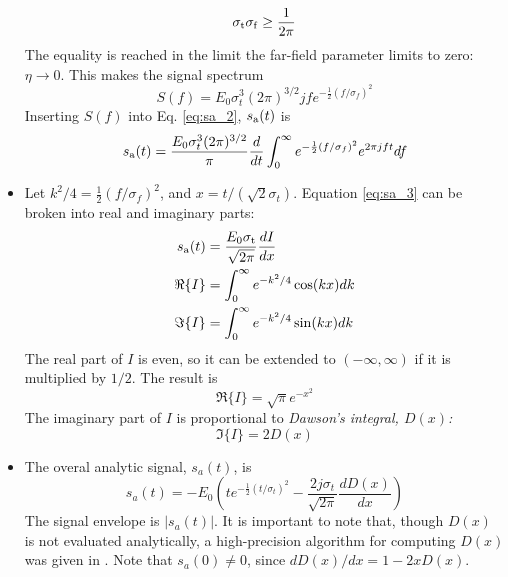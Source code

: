 \documentclass[amsmath,amssymb,aps,prd,10pt,twocolumn,showkeys]{revtex4}
\begin{document}
\begin{itemize}
\begin{equation}
\sigma_{\rm t} \sigma_{\rm f} \geq \frac{1}{2\pi}
\end{equation}
The equality is reached in the limit the far-field parameter limits to zero: $\eta \to 0$.  This makes the signal spectrum
\begin{equation}
S(f) = E_0 \sigma_t^3 (2\pi)^{3/2} j f e^{-\frac{1}{2}\left(f/\sigma_f\right)^2}
\end{equation}
Inserting $S(f)$ into Eq. \ref{eq:sa_2}, $s_{\rm a}(t)$ is
\begin{equation}
s_{\rm a}(t) = \frac{E_0 \sigma_t^3 (2\pi)^{3/2}}{\pi} \frac{d}{dt}\int_0^{\infty} e^{-\frac{1}{2}\left(f/\sigma_f\right)^2} e^{2\pi j f t} df \label{eq:sa_3}
\end{equation}
\item Let $k^2/4 = \frac{1}{2}\left(f/\sigma_f\right)^2$, and $x = t/(\sqrt{2}\sigma_t)$.  Equation \ref{eq:sa_3} can be broken into real and imaginary parts:
\begin{align}
s_{\rm a}(t) &= \frac{E_0 \sigma_{\rm t}}{\sqrt{2\pi}}\frac{dI}{dx} \\
\Re\lbrace I \rbrace &= \int_0^{\infty} e^{-k^2/4}\cos(kx) dk \\
\Im\lbrace I \rbrace &= \int_0^{\infty} e^{-k^2/4}\sin(kx) dk
\end{align}
The real part of $I$ is even, so it can be extended to $(-\infty,\infty)$ if it is multiplied by $1/2$.  The result is
\begin{equation}
\Re\lbrace I \rbrace = \sqrt{\pi} e^{-x^2}
\end{equation}
The imaginary part of $I$ is proportional to \textit{Dawson's integral, $D(x)$:}
\begin{equation}
\Im\lbrace I\rbrace = 2 D(x)
\end{equation}
\item The overal analytic signal, $s_a(t)$, is
\begin{equation}
s_a(t) = -E_0 \left(t e^{-\frac{1}{2}\left(t/\sigma_t\right)^2} - \frac{2 j\sigma_t}{\sqrt{2\pi}} \frac{dD(x)}{dx}\right) \label{eq:sa_4}
\end{equation}
The signal envelope is $|s_a(t)|$.  It is important to note that, though $D(x)$ is not evaluated analytically, a high-precision algorithm for computing $D(x)$ was given in \cite{10.1063/1.4822832}.  Note that $s_a(0) \neq 0$, since $dD(x)/dx = 1 - 2x D(x)$.

\end{itemize}
\end{document}
